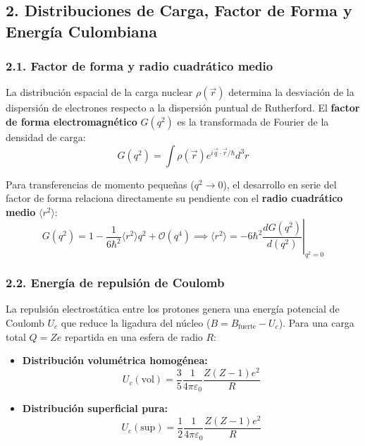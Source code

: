 \subsection*{2. Distribuciones de Carga, Factor de Forma y Energía Culombiana}

\subsubsection*{2.1. Factor de forma y radio cuadrático medio}
La distribución espacial de la carga nuclear $\rho(\vec{r})$ determina la desviación de la dispersión de electrones respecto a la dispersión puntual de Rutherford. El \textbf{factor de forma electromagnético} $G(q^2)$ es la transformada de Fourier de la densidad de carga:
\begin{equation}
G(q^2) = \int \rho(\vec{r}) e^{i \vec{q} \cdot \vec{r} / \hbar} d^3r
\end{equation}

Para transferencias de momento pequeñas ($q^2 \to 0$), el desarrollo en serie del factor de forma relaciona directamente su pendiente con el \textbf{radio cuadrático medio} $\langle r^2 \rangle$:
\begin{equation}
G(q^2) = 1 - \frac{1}{6\hbar^2} \langle r^2 \rangle q^2 + \mathcal{O}(q^4) \implies \langle r^2 \rangle = -6\hbar^2 \left. \frac{d G(q^2)}{d(q^2)} \right|_{q^2=0}
\end{equation}

\subsubsection*{2.2. Energía de repulsión de Coulomb}
La repulsión electrostática entre los protones genera una energía potencial de Coulomb $U_c$ que reduce la ligadura del núcleo ($B = B_{\text{fuerte}} - U_c$). Para una carga total $Q = Z e$ repartida en una esfera de radio $R$:
\begin{itemize}
    \item \textbf{Distribución volumétrica homogénea:}
    \begin{equation}
    U_c(\text{vol}) = \frac{3}{5} \frac{1}{4\pi\varepsilon_0} \frac{Z(Z-1) e^2}{R}
    \end{equation}
    \item \textbf{Distribución superficial pura:}
    \begin{equation}
    U_c(\text{sup}) = \frac{1}{2} \frac{1}{4\pi\varepsilon_0} \frac{Z(Z-1) e^2}{R}
    \end{equation}
\end{itemize}

